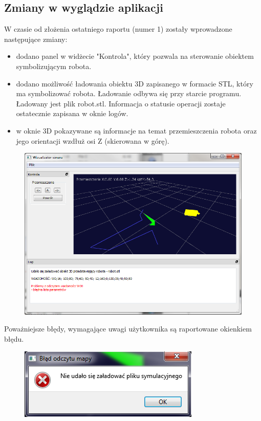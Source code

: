 \documentclass[a4paper,12pt]{article}
\begin{document}
\subsection{Zmiany w wyglądzie aplikacji}
W czasie od złożenia ostatniego raportu (numer 1) zostały wprowadzone następujące zmiany:
\begin{itemize}
\item dodano panel w widżecie "Kontrola", który pozwala na sterowanie obiektem symbolizującym robota.
\item dodano możliwość ładowania obiektu 3D zapisanego w formacie STL, który ma symbolizować robota. Ładowanie odbywa się przy starcie programu. Ładowany jest plik robot.stl. Informacja o statusie operacji zostaje ostatecznie zapisana w oknie logów.
\item w oknie 3D pokazywane są informacje na temat przemieszczenia robota oraz jego orientacji wzdłuż osi Z (skierowana w górę). 
\end{itemize}
\begin{figure} [H]
\centering
\includegraphics[width=\textwidth]{screen.jpg}
\end{figure}

Poważniejsze błędy, wymagające uwagi użytkownika są raportowane okienkiem błędu. 
\begin{figure} [H]
\centering
\includegraphics{error_screen.png}
\end{figure}
\end{document}
